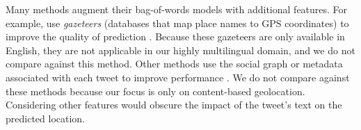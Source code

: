 \documentclass[sigconf,anonymous,review]{acmart}
\newcommand{\defn}[1]{\textit{#1}}
\newcommand{\fixme}[1]{\textcolor{red}{\textbf{FIXME:} {#1}}}
\begin{document}
\begin{description}
Many methods augment their bag-of-words models with additional features.
For example, \citet{zhang2014geocoding} use \defn{gazeteers} 
(databases that map place names to GPS coordinates) to improve the quality of prediction \citep{zhang2014geocoding}.
Because these gazeteers are only available in English,
they are not applicable in our highly multilingual domain,
and we do not compare against this method.
Other methods use the social graph or metadata associated with each tweet to improve performance \citep[e.g.][]{hecht2011tweets,schulz2013multi,han2014text}.
We do not compare against these methods because our focus is only on content-based geolocation.
Considering other features would obscure the impact of the tweet's text on the predicted location.


%


\end{description}
\end{document}
